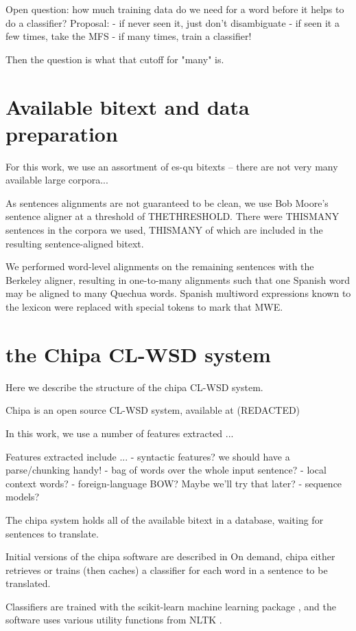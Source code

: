 \documentclass[10pt, a4paper]{article}
\begin{document}
Open question: how much training data do we need for a word before it helps to
do a classifier?
Proposal:
- if never seen it, just don't disambiguate
- if seen it a few times, take the MFS
- if many times, train a classifier!


Then the question is what that cutoff for "many" is.



\section{Available bitext and data preparation}
For this work, we use an assortment of es-qu bitexts -- there are not very many
available large corpora...

As sentences alignments are not guaranteed to be clean, we use Bob Moore's
sentence aligner
\cite{DBLP:conf/amta/Moore02}
at a threshold of THETHRESHOLD. There were
THISMANY sentences in the corpora we used, THISMANY of which are included in
the resulting sentence-aligned bitext.


We performed word-level alignments on the remaining sentences with the Berkeley
aligner, resulting in one-to-many alignments such that one Spanish word may be
aligned to many Quechua words. Spanish multiword expressions known to the
lexicon were replaced with special tokens to mark that MWE.


\section{the Chipa CL-WSD system}
Here we describe the structure of the chipa CL-WSD system.


Chipa is an open source CL-WSD system, available at (REDACTED)


In this work, we use a number of features extracted ...


Features extracted include ...
- syntactic features? we should have a parse/chunking handy!
- bag of words over the whole input sentence?
- local context words?
- foreign-language BOW? Maybe we'll try that later?
- sequence models?


The chipa system holds all of the available bitext in a database, waiting for
sentences to translate.


Initial versions of the chipa software are described in
\cite{rudnick-gasser:2013:HyTra}
On demand, chipa either retrieves or trains (then caches) a classifier
for each word in a sentence to be translated.


Classifiers are trained with the scikit-learn machine learning package
\cite{scikit-learn}, and the software uses various utility functions from NLTK
\cite{nltkbook}.
\end{document}
